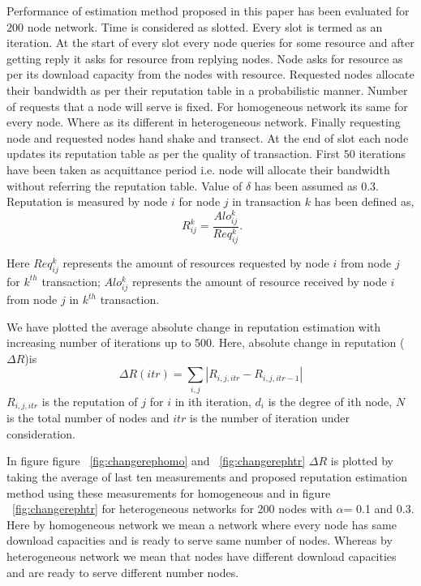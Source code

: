 \documentclass{IEEEtran}
\begin{document}
Performance of estimation method proposed in this paper has been evaluated for $200$ node network. Time is considered as slotted. Every slot is termed as an iteration. At the start of every slot every node queries for some resource and after getting reply it asks for resource from replying nodes. Node asks for resource as per its download capacity from the nodes with resource. Requested nodes allocate their bandwidth as per their reputation table in a probabilistic manner. Number of requests that a node will serve is fixed. For homogeneous network its same for every node. Where as its different in heterogeneous network.  Finally requesting node and requested nodes hand shake and transect. At the end of slot each node updates its reputation table as per the quality of transaction. First $50$ iterations have been taken as acquittance period i.e.  node will allocate their bandwidth without referring the reputation table. Value of $\delta$ has been assumed as $0.3$. Reputation is measured by node $i$ for node $j$ in transaction $k$ has been defined as,
\begin{equation}\
  R^{k}_{ij}=\frac {Alo^{k}_{ij}}{Req^{k}_{ij}}.
\end{equation}

Here $ Req^{k}_{ij} $ represents the amount of resources requested by node $i$ from node $j$
for $k^{th}$ transaction;  $ Alo^{k}_{ij} $ represents the amount of resource
received by node $i$ from node $j$ in $k^{th}$ transaction.

We have plotted the average absolute change in reputation estimation with increasing number of iterations up to $500$. Here, absolute change in reputation ($\Delta R$)is
\begin{equation}
\Delta R(itr)=\sum\limits_{i,j}|R_{i,j,itr}-R_{i,j,itr-1}|
\end{equation}
$R_{i,j,itr}$ is the reputation of $j$ for $i$ in ith iteration, $d_{i}$ is the degree of ith node, $N$ is the total number of nodes and $itr$ is the number of iteration under consideration. 

In figure figure ~\ref{fig:changerephomo} and ~\ref{fig:changerephtr} $\Delta R$ is plotted by taking the average of last ten measurements \cite{Reputation-based resource allocation} and proposed reputation estimation method using these measurements for homogeneous and in figure ~\ref{fig:changerephtr} for heterogeneous networks for 200 nodes with $\alpha$= 0.1 and 0.3. Here by homogeneous network we mean a network where every node has same download capacities and is ready to serve same number of nodes. Whereas by heterogeneous network we mean that nodes have different download capacities and are ready to serve different number nodes.
\end{document}
